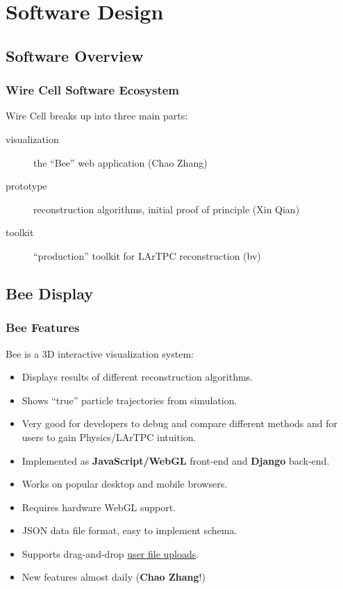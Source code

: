 \documentclass[xcolor=dvipsnames]{beamer}
\begin{document}
\section{Software Design}

\begin{frame}
\end{frame}

\subsection{Software Overview}

\begin{frame}
  \frametitle{Wire Cell Software Ecosystem}

  Wire Cell breaks up into three main parts:

  \begin{description}
  \item[visualization] the ``Bee'' web application (Chao Zhang)
  \item[prototype] reconstruction algorithms, initial proof of
    principle (Xin Qian)
  \item[toolkit] ``production'' toolkit for LArTPC reconstruction (bv)
  \end{description}

\end{frame}

\subsection{Bee Display}

\begin{frame}
  \frametitle{Bee Features}

  Bee is a 3D interactive visualization system:
  \begin{itemize}
  \item Displays results of different reconstruction algorithms.
  \item Shows ``true'' particle trajectories from simulation.
  \item Very good for developers to debug and compare different
    methods and for users to gain Physics/LArTPC intuition.
  \item Implemented as \textbf{JavaScript/WebGL} front-end and
    \textbf{Django} back-end.
  \item Works on popular desktop and mobile browsers.
  \item Requires hardware WebGL support.
  \item JSON data file format, easy to implement schema.
  \item Supports drag-and-drop
    \href{http://bnlif.github.io/wire-cell-docs/viz/uploads/}{user
      file uploads}.
  \item New features almost daily (\textbf{Chao Zhang}!)
  \end{itemize}
\end{frame}
\end{document}
